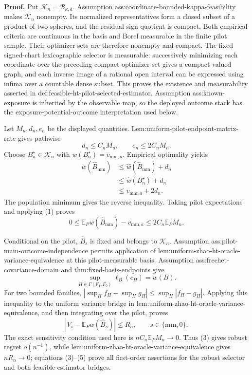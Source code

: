 \textbf{Proof.}
Put \(\mathcal K_n=\mathcal B_{\kappa,\overline a}\).  Assumption ass:coordinate-bounded-kappa-feasibility makes \(\mathcal K_n\) nonempty.  Its normalized representatives form a closed subset of a product of two spheres, and the residual sign quotient is compact.  Both empirical criteria are continuous in the basis and Borel measurable in the finite pilot sample.  Their optimizer sets are therefore nonempty and compact.  The fixed signed-chart lexicographic selector is measurable: successively minimizing each coordinate over the preceding compact optimizer set gives a compact-valued graph, and each inverse image of a rational open interval can be expressed using infima over a countable dense subset.  This proves the existence and measurability asserted in def:feasible-ht-pilot-selected-estimator.  Assumption ass:known-exposure is inherited by the observable map, so the deployed outcome stack has the exposure-potential-outcome interpretation used below.

Let \(M_n,d_n,e_n\) be the displayed quantities.  Lem:uniform-pilot-endpoint-matrix-rate gives pathwise
\[
d_n\le C_nM_n,
\qquad
e_n\le2C_nM_n.
\tag{1}
\]
Choose \(B_n^\star\in\mathcal K_n\) with \(w(B_n^\star)=v_{\mathrm{mm},\overline a}\).  Empirical optimality yields
\[
\begin{aligned}
w(\widehat B_{\mathrm{mm}})
&\le\widehat w(\widehat B_{\mathrm{mm}})+d_n\\
&\le\widehat w(B_n^\star)+d_n\\
&\le v_{\mathrm{mm},\overline a}+2d_n.
\end{aligned}
\tag{2}
\]
The population minimum gives the reverse inequality.  Taking pilot expectations and applying (1) proves
\[
0\le\mathbb E_Pw(\widehat B_{\mathrm{mm}})-v_{\mathrm{mm},\overline a}
\le2C_n\mathbb E_PM_n.
\tag{3}
\]

Conditional on the pilot, \(\widehat B_s\) is fixed and belongs to \(\mathcal K_n\).  Assumption ass:pilot-main-outcome-independence permits application of lem:uniform-zhao-ht-oracle-variance-equivalence at this pilot-measurable basis.  Assumption ass:frechet-covariance-domain and thm:fixed-basis-endpoints give
\[
\sup_{H\in\Gamma(F_1,F_0)}\ell_B(c_H)=w(B).
\tag{4}
\]
For two bounded families, \(|\sup_Hf_H-\sup_Hg_H|\le\sup_H|f_H-g_H|\).  Applying this inequality to the uniform variance bridge in lem:uniform-zhao-ht-oracle-variance-equivalence, and then integrating over the pilot, proves
\[
|V_s-\mathbb E_Pw(\widehat B_s)|\le R_n,
\qquad s\in\{\mathrm{mm},0\}.
\tag{5}
\]
The exact sensitivity condition used here is \(nC_n\mathbb E_PM_n\to0\).  Thus (3) gives robust regret \(o(n^{-1})\), while lem:uniform-zhao-ht-oracle-variance-equivalence gives \(nR_n\to0\); equations (3)--(5) prove all first-order assertions for the robust selector and both feasible-estimator bridges.

